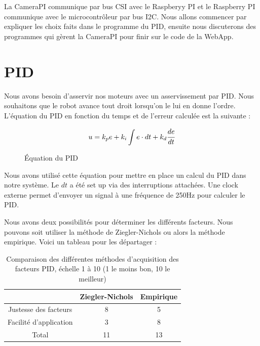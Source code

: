 \documentclass[
	a4paper,									%
	11pt,										%
	twoside,									%
	openright,									%
	notitlepage,									%
	parskip=half,								%
]{scrreprt}										%
\begin{document}
La CameraPI communique par bus CSI avec le Raspberyy PI et le Raspberry PI communique avec le microcontrôleur
par bus I2C. Nous allons commencer par expliquer les choix faits dans le programme du PID, ensuite nous discuterons
des programmes qui gèrent la CameraPI pour finir sur le code de la WebApp. \par


\section{PID}

Nous avons besoin d'asservir nos moteurs avec un asservissement par PID. Nous souhaitons que le robot avance
tout droit lorsqu'on le lui en donne l'ordre. L'équation du PID en fonction du temps et de l'erreur calculée 
est la suivante : 

\begin{figure}[h]
	\[u=k_pe + k_i \int e \cdot dt + k_d \cfrac{de}{dt}\] 
	\caption{Équation du PID}
	\label{eq1}
\end{figure}

Nous avons utilisé cette équation pour mettre en place un calcul du PID dans notre système. Le $dt$ a été 
set up via des interruptions attachées. Une clock externe permet d'envoyer un signal à une fréquence de 250Hz
pour calculer le PID. \par

Nous avons deux possibilités pour déterminer les différents facteurs. Nous pouvons soit utiliser la méthode 
de Ziegler-Nichols ou alors la méthode empirique. Voici un tableau pour les départager : 

\begin{table}[!ht]
    \begin{center}
        \vspace{5mm}
        \label{tab:table7}
        \begin{tabular}{c|c|c} %
            \toprule
            \textbf{ } & \textbf{Ziegler-Nichols} & \textbf{Empirique}\\
            \midrule
            Justesse des facteurs & 8 & 5\\
            Facilité d'application & 3 & 8\\
            \midrule
			Total & 11 & 13\\
            \bottomrule
        \end{tabular}
    \end{center}    
	\caption{Comparaison des différentes méthodes d'acquisition des facteurs PID, échelle 1 à 10 (1 le moins bon, 10 le meilleur)}
\end{table}
\end{document}
